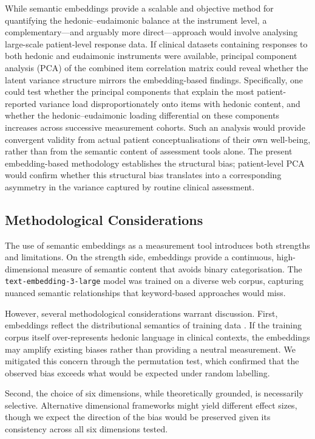 \documentclass[12pt,a4paper]{article}
\begin{document}
While semantic embeddings provide a scalable and objective method for quantifying the hedonic--eudaimonic balance at the instrument level, a complementary---and arguably more direct---approach would involve analysing large-scale patient-level response data.
If clinical datasets containing responses to both hedonic and eudaimonic instruments were available, principal component analysis (PCA) of the combined item correlation matrix could reveal whether the latent variance structure mirrors the embedding-based findings.
Specifically, one could test whether the principal components that explain the most patient-reported variance load disproportionately onto items with hedonic content, and whether the hedonic--eudaimonic loading differential on these components increases across successive measurement cohorts.
Such an analysis would provide convergent validity from actual patient conceptualisations of their own well-being, rather than from the semantic content of assessment tools alone.
The present embedding-based methodology establishes the structural bias; patient-level PCA would confirm whether this structural bias translates into a corresponding asymmetry in the variance captured by routine clinical assessment.

\subsection{Methodological Considerations}

The use of semantic embeddings as a measurement tool introduces both strengths and limitations.
On the strength side, embeddings provide a continuous, high-dimensional measure of semantic content that avoids binary categorisation.
The \texttt{text-embedding-3-large} model was trained on a diverse web corpus, capturing nuanced semantic relationships that keyword-based approaches would miss.

However, several methodological considerations warrant discussion.
First, embeddings reflect the distributional semantics of training data \citep{bender2021dangers}.
If the training corpus itself over-represents hedonic language in clinical contexts, the embeddings may amplify existing biases rather than providing a neutral measurement.
We mitigated this concern through the permutation test, which confirmed that the observed bias exceeds what would be expected under random labelling.

Second, the choice of six dimensions, while theoretically grounded, is necessarily selective.
Alternative dimensional frameworks might yield different effect sizes, though we expect the direction of the bias would be preserved given its consistency across all six dimensions tested.
\end{document}
